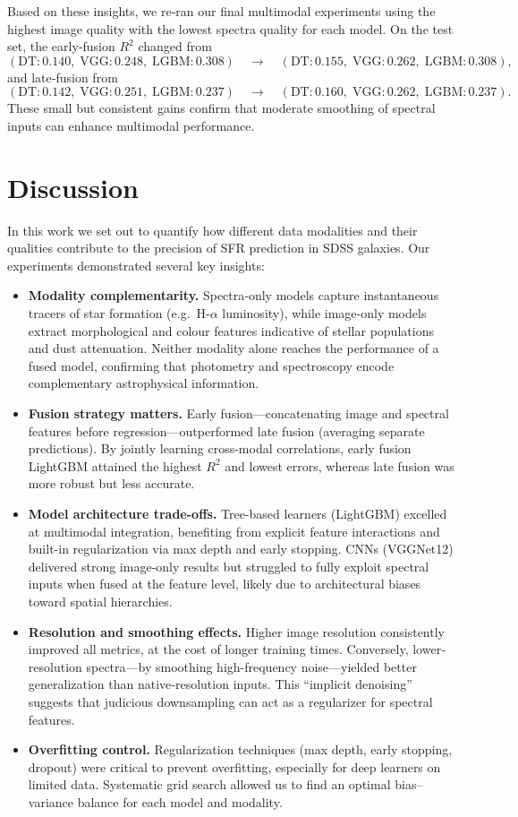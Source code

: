 \documentclass[english,bachelor,oneside]{ctufit-thesis}
\begin{document}
Based on these insights, we re‐ran our final multimodal experiments using the highest image quality with the lowest spectra quality for each model. On the test set, the early‐fusion $R^2$ changed from 
\[
(\text{DT}:0.140,\;\text{VGG}:0.248,\;\text{LGBM}:0.308)\quad\rightarrow\quad
(\text{DT}:0.155,\;\text{VGG}:0.262,\;\text{LGBM}:0.308),
\]
and late‐fusion from 
\[
(\text{DT}:0.142,\;\text{VGG}:0.251,\;\text{LGBM}:0.237)\quad\rightarrow\quad
(\text{DT}:0.160,\;\text{VGG}:0.262,\;\text{LGBM}:0.237).
\]
These small but consistent gains confirm that moderate smoothing of spectral inputs can enhance multimodal performance.

\chapter{Discussion}
\label{ch:discussion}

In this work we set out to quantify how different data modalities and their qualities contribute to the precision of SFR prediction in SDSS galaxies. Our experiments demonstrated several key insights:

\begin{itemize}
  \item \textbf{Modality complementarity.} Spectra‐only models capture instantaneous tracers of star formation (e.g.\ H-$\alpha$ luminosity), while image‐only models extract morphological and colour features indicative of stellar populations and dust attenuation. Neither modality alone reaches the performance of a fused model, confirming that photometry and spectroscopy encode complementary astrophysical information.
  \item \textbf{Fusion strategy matters.} Early fusion—concatenating image and spectral features before regression—outperformed late fusion (averaging separate predictions). By jointly learning cross-modal correlations, early fusion LightGBM attained the highest $R^2$ and lowest errors, whereas late fusion was more robust but less accurate.
  \item \textbf{Model architecture trade-offs.} Tree-based learners (LightGBM) excelled at multimodal integration, benefiting from explicit feature interactions and built-in regularization via max depth and early stopping. CNNs (VGGNet12) delivered strong image‐only results but struggled to fully exploit spectral inputs when fused at the feature level, likely due to architectural biases toward spatial hierarchies.
  \item \textbf{Resolution and smoothing effects.} Higher image resolution consistently improved all metrics, at the cost of longer training times. Conversely, lower‐resolution spectra—by smoothing high-frequency noise—yielded better generalization than native‐resolution inputs. This “implicit denoising” suggests that judicious downsampling can act as a regularizer for spectral features.
  \item \textbf{Overfitting control.} Regularization techniques (max depth, early stopping, dropout) were critical to prevent overfitting, especially for deep learners on limited data. Systematic grid search allowed us to find an optimal bias–variance balance for each model and modality.
\end{itemize}
\end{document}

